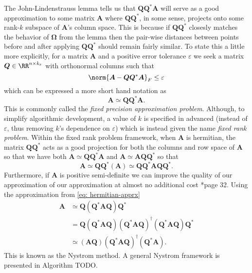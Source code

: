 The John-Lindenstrauss lemma tells us that $\bm{Q} \bm{Q}^{\ast} \bm{A}$ will serve as a good approximation to some matrix $\bm{A}$ where $\bm{Q} \bm{Q}^{\ast}$, in some sense, projects onto some rank-$k$ subspace of $\bm{A}$'s column space. This is because if $\bm{Q} \bm{Q}^{\ast}$ closesly matches the behavior of $\bm{\Omega}$ from the lemma then the pair-wise distances between points before and after applying $\bm{Q} \bm{Q}^{\ast}$ should remain fairly similar. To state this a little more explicitly, for a matrix $\bm{A}$ and a positive error tolerance $\varepsilon$ we seek a matrix $\bm{Q} \in \RR^{n \times k_{\varepsilon}}$ with orthonormal columns such that
\begin{equation*}
    \norm{\bm{A} - \bm{Q} \bm{Q}^{\ast} \bm{A}}_{F} \leq \varepsilon
\end{equation*}
which can be expressed a more short hand notation as
\begin{equation} \label{eq: nys-Q-cond}
    \bm{A} \simeq \bm{Q} \bm{Q}^{\ast} \bm{A}.
\end{equation}
This is commonly called the {\it fixed precision approximation problem}. Although, to simplify algorithmic development, a value of $k$ is specified in advanced (instead of $\varepsilon$, thus removing $k$'s dependence on $\varepsilon$) which is instead given the name {\it fixed rank problem}. Within the fixed rank problem framework, when $\bm{A}$ is hermitian, the matrix $\bm{Q} \bm{Q}^{\ast}$ acts as a good projection for both the columns and row space of $\bm{A}$ so that we have both $\bm{A} \simeq \bm{Q} \bm{Q}^{\ast} \bm{A}$ and $\bm{A} \simeq \bm{A} \bm{Q} \bm{Q}^{\ast}$ so that
\begin{equation} \label{eq: hermitian-apprx}
    \bm{A} \simeq \bm{Q} \bm{Q}^{\ast} \left( \bm{A} \right) \simeq \bm{Q} \bm{Q}^{\ast} \bm{A} \bm{Q} \bm{Q}^{\ast}.
\end{equation}
Furthermore, if $\bm{A}$ is positive semi-definite we can improve the quality of our approximation of our approximation at almost no additional cost \cite{halko2011finding}*{page 32}. Using the approximation from \ref{eq: hermitian-apprx}
\begin{align} \label{eq: nys-apprx}
    \bm{A} & \simeq \bm{Q} \left( \bm{Q}^{\ast} \bm{A} \bm{Q} \right) \bm{Q}^{\ast} \nonumber                                                                                            \\
           & = \bm{Q} \left( \bm{Q}^{\ast} \bm{A} \bm{Q} \right) \left( \bm{Q}^{\ast} \bm{A} \bm{Q} \right)^{\dagger} \left( \bm{Q}^{\ast} \bm{A} \bm{Q} \right) \bm{Q}^{\ast} \nonumber \\
           & \simeq \left( \bm{A} \bm{Q} \right) \left( \bm{Q}^{\ast} \bm{A} \bm{Q} \right)^{\dagger} \left( \bm{Q}^{\ast} \bm{A} \right).
\end{align}
This is known as the Nystrom method. A general Nystrom framework is presented in Algorithm TODO.